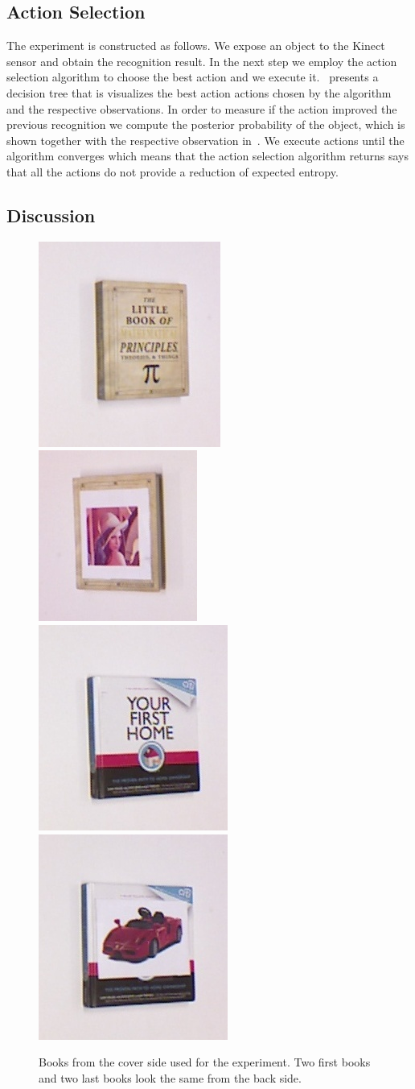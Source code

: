     \subsection{Action Selection}
        The experiment is constructed as follows. We expose an object to the Kinect sensor and obtain the recognition result. In the next step we employ the action selection algorithm to choose the best action and we execute it.~ presents a decision tree that is visualizes the best action actions chosen by the algorithm and the respective observations. In order to measure if the action improved the previous recognition we compute the posterior probability of the object, which is shown together with the respective observation in~. We execute actions until the algorithm converges which means that the action selection algorithm returns says that all the actions do not provide a reduction of expected entropy.

    \subsection{Discussion}
        
\begin{figure}
    		\includegraphics[width = 0.2\columnwidth]{pics/math_cover1_ok.jpg}
    		\includegraphics[width = 0.2\columnwidth]{pics/math_cover2_ok.jpg}
    		\includegraphics[width = 0.2\columnwidth]{pics/first_cover1.jpg}
    		\includegraphics[width = 0.2\columnwidth]{pics/first_cover2.jpg}
    		\caption{Books from the cover side used for the experiment. Two first books and two last books look the same from the back side.}
	\label{fig:object_dataset}
    \end{figure}        
        
